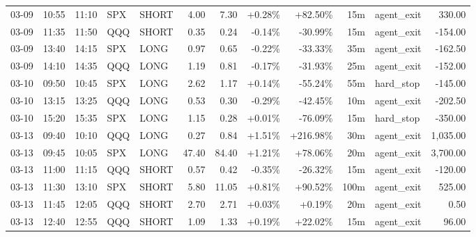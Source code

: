\documentclass[11pt,a4paper]{article}
\begin{document}
\begin{center}
\begin{longtable}{>{\color{txtmain}}l l l l l r r r r r >{\color{txtmain}}l r}
03-09 & 10:55 & 11:10 & SPX & SHORT & 4.00 & 7.30 & \textcolor{wingreen}{+0.28\%} & \textcolor{wingreen}{+82.50\%} & 15m & agent\_exit & \textcolor{wingreen}{330.00} \\
03-09 & 11:35 & 11:50 & QQQ & SHORT & 0.35 & 0.24 & \textcolor{lossred}{-0.14\%} & \textcolor{lossred}{-30.99\%} & 15m & agent\_exit & \textcolor{lossred}{-154.00} \\
03-09 & 13:40 & 14:15 & SPX & LONG & 0.97 & 0.65 & \textcolor{lossred}{-0.22\%} & \textcolor{lossred}{-33.33\%} & 35m & agent\_exit & \textcolor{lossred}{-162.50} \\
03-09 & 14:10 & 14:35 & QQQ & LONG & 1.19 & 0.81 & \textcolor{lossred}{-0.17\%} & \textcolor{lossred}{-31.93\%} & 25m & agent\_exit & \textcolor{lossred}{-152.00} \\
03-10 & 09:50 & 10:45 & SPX & LONG & 2.62 & 1.17 & \textcolor{wingreen}{+0.14\%} & \textcolor{lossred}{-55.24\%} & 55m & hard\_stop & \textcolor{lossred}{-145.00} \\
03-10 & 13:15 & 13:25 & QQQ & LONG & 0.53 & 0.30 & \textcolor{lossred}{-0.29\%} & \textcolor{lossred}{-42.45\%} & 10m & agent\_exit & \textcolor{lossred}{-202.50} \\
03-10 & 15:20 & 15:35 & SPX & LONG & 1.15 & 0.28 & \textcolor{wingreen}{+0.01\%} & \textcolor{lossred}{-76.09\%} & 15m & hard\_stop & \textcolor{lossred}{-350.00} \\
03-13 & 09:40 & 10:10 & QQQ & LONG & 0.27 & 0.84 & \textcolor{wingreen}{+1.51\%} & \textcolor{wingreen}{+216.98\%} & 30m & agent\_exit & \textcolor{wingreen}{1,035.00} \\
03-13 & 09:45 & 10:05 & SPX & LONG & 47.40 & 84.40 & \textcolor{wingreen}{+1.21\%} & \textcolor{wingreen}{+78.06\%} & 20m & agent\_exit & \textcolor{wingreen}{3,700.00} \\
03-13 & 11:00 & 11:15 & QQQ & SHORT & 0.57 & 0.42 & \textcolor{lossred}{-0.35\%} & \textcolor{lossred}{-26.32\%} & 15m & agent\_exit & \textcolor{lossred}{-120.00} \\
03-13 & 11:30 & 13:10 & SPX & SHORT & 5.80 & 11.05 & \textcolor{wingreen}{+0.81\%} & \textcolor{wingreen}{+90.52\%} & 100m & agent\_exit & \textcolor{wingreen}{525.00} \\
03-13 & 11:45 & 12:05 & QQQ & SHORT & 2.70 & 2.71 & \textcolor{wingreen}{+0.03\%} & \textcolor{wingreen}{+0.19\%} & 20m & agent\_exit & \textcolor{wingreen}{0.50} \\
03-13 & 12:40 & 12:55 & QQQ & SHORT & 1.09 & 1.33 & \textcolor{wingreen}{+0.19\%} & \textcolor{wingreen}{+22.02\%} & 15m & agent\_exit & \textcolor{wingreen}{96.00} \\

\end{longtable}
\end{center}
\end{document}
